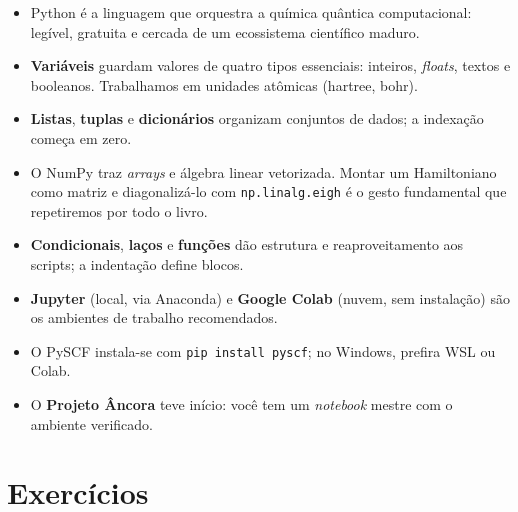 \documentclass[11pt,a4paper,openany]{book}
\newcommand{\code}[1]{\texttt{#1}}
\newcommand{\pyscf}{\textsf{PySCF}}
\newcommand{\numpy}{\textsf{NumPy}}
\newcommand{\python}{\textsf{Python}}
\begin{document}
\begin{itemize}[leftmargin=*]
  \item \python{} é a linguagem que orquestra a química quântica computacional:
        legível, gratuita e cercada de um ecossistema científico maduro.
  \item \textbf{Variáveis} guardam valores de quatro tipos essenciais: inteiros,
        \emph{floats}, textos e booleanos. Trabalhamos em unidades atômicas
        (hartree, bohr).
  \item \textbf{Listas}, \textbf{tuplas} e \textbf{dicionários} organizam
        conjuntos de dados; a indexação começa em zero.
  \item O \numpy{} traz \emph{arrays} e álgebra linear vetorizada. Montar um
        Hamiltoniano como matriz e diagonalizá-lo com \code{np.linalg.eigh} é o
        gesto fundamental que repetiremos por todo o livro.
  \item \textbf{Condicionais}, \textbf{laços} e \textbf{funções} dão estrutura e
        reaproveitamento aos scripts; a indentação define blocos.
  \item \textbf{Jupyter} (local, via Anaconda) e \textbf{Google Colab} (nuvem,
        sem instalação) são os ambientes de trabalho recomendados.
  \item O \pyscf{} instala-se com \code{pip install pyscf}; no Windows, prefira WSL
        ou Colab.
  \item O \textbf{Projeto Âncora} teve início: você tem um \emph{notebook} mestre
        com o ambiente verificado.
\end{itemize}

\section*{Exercícios}
\end{document}
